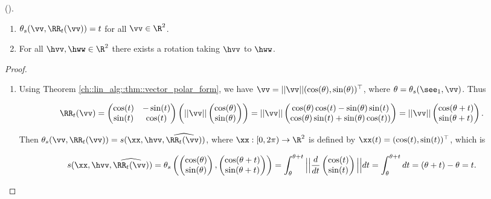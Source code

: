 \begin{theorem}
	().
	
	\begin{enumerate}
		\item $\theta_s(\vv, \RR_t(\vv)) = t$ for all $\vv \in \R^2$.
		\item For all $\hvv, \hww \in \R^2$ there exists a rotation taking $\hvv$ to $\hww$.
	\end{enumerate}
\end{theorem}

\begin{proof}
	\mbox{} \\
	\begin{enumerate}
		\item Using Theorem \ref{ch::lin_alg::thm::vector_polar_form}, we have $\vv = ||\vv||(\cos(\theta), \sin(\theta))^\top$, where $\theta = \theta_s(\see_1, \vv)$. Thus
		
		\begin{align*}
			\RR_t(\vv) =
			\begin{pmatrix}
				\cos(t) & -\sin(t) \\
				\sin(t) & \cos(t)
			\end{pmatrix}
			\left(
			||\vv||
			\begin{pmatrix}
				\cos(\theta) \\ \sin(\theta)
			\end{pmatrix}
			\right)
			=
			||\vv||
			\begin{pmatrix}
				\cos(\theta) \cos(t) - \sin(\theta) \sin(t) \\
				\cos(\theta) \sin(t) + \sin(\theta) \cos(t))
			\end{pmatrix}
			=
			||\vv||
			\begin{pmatrix}
				\cos(\theta + t) \\
				\sin(\theta + t)
			\end{pmatrix}.
		\end{align*}
		
		Then $\theta_s(\vv, \RR_t(\vv)) = s(\xx, \hvv, \widehat{\RR_t(\vv)})$, where $\xx:[0, 2\pi) \rightarrow \R^2$ is defined by $\xx(t) = (\cos(t), \sin(t))^\top$, which is
		
		\begin{align*}
			s(\xx, \hvv, \widehat{\RR_t(\vv)}) =
			\theta_s
			\left(
			\begin{pmatrix} \cos(\theta) \\ \sin(\theta) \end{pmatrix},
			\begin{pmatrix} \cos(\theta + t) \\ \sin(\theta + t) \end{pmatrix}
			\right)
			=
			\int_{\theta}^{\theta + t}
			\Big|\Big|
			\frac{d}{dt}
			\begin{pmatrix}
				\cos(t) \\
				\sin(t)
			\end{pmatrix}
			\Big|\Big|
			dt
			=
			\int_{\theta}^{\theta + t} dt
			= (\theta + t) - \theta = t.
		\end{align*}
		

\end{enumerate}
\end{proof}

